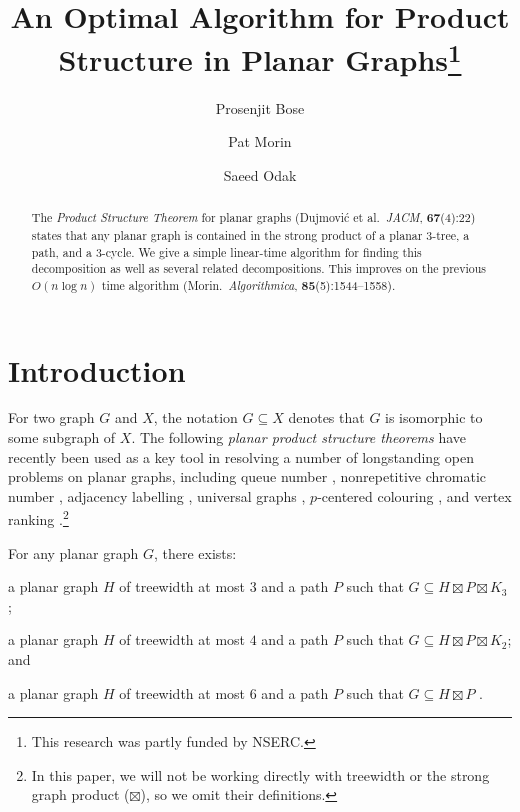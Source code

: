 \documentclass[a4paper,UKenglish,autoref]{lipics-v2021}
\title{An Optimal Algorithm for Product Structure \newline in Planar Graphs\thanks{This research was partly funded by NSERC.}}
\author{Prosenjit Bose}{Carleton University School of Computer Science}{jit@scs.carleton.ca}{https://orcid.org/0000-0002-8906-0573}{}
\author{Pat Morin}{Carleton University School of Computer Science}{morin@scs.carleton.ca}{https://orcid.org/0000-0003-0471-4118}{}
\author{Saeed Odak}{University of Ottawa Department of Computer Science and Electrical Engineering}{saeed.odak@gmail.com}{}{}
\begin{document}
\maketitle

\begin{abstract}
  The \emph{Product Structure Theorem} for planar graphs (Dujmović et al.\ \emph{JACM}, \textbf{67}(4):22) states that any planar graph is contained in the strong product of a planar $3$-tree, a path, and a $3$-cycle.  We give a simple linear-time algorithm for finding this decomposition as well as several related decompositions.  This improves on the previous $O(n\log n)$ time algorithm (Morin.\ \emph{Algorithmica}, \textbf{85}(5):1544--1558).
\end{abstract}

%

\section{Introduction}

For two graph $G$ and $X$, the notation $G\subseteq X$ denotes that $G$ is isomorphic to some subgraph of $X$.
The following \emph{planar product structure theorems} have recently been used as a key tool in resolving a number of longstanding open problems on planar graphs, including queue number \cite{dujmovic.joret.ea:planar}, nonrepetitive chromatic number \cite{dujmovic.esperet.ea:planar}, adjacency labelling \cite{dujmovic.esperet.ea:adjacency}, universal graphs \cite{esperet.joret.ea:sparse}, $p$-centered colouring \cite{debski.felsner.ea:improved}, and vertex ranking \cite{bose.dujmovic.ea:asymptotically}.\footnote{In this paper, we will not be working directly with treewidth or the strong graph product ($\boxtimes$), so we omit their definitions.}

\begin{thm}\label{meta}
  For any planar graph $G$, there exists:
  \begin{compactenum}[(a)]
    \item \label{three_tree} a planar graph $H$ of treewidth at most $3$ and a path $P$ such that $G\subseteq H\boxtimes P\boxtimes K_3$ \cite{dujmovic.joret.ea:planar};
    \item \label{four_tree} a planar graph $H$ of treewidth at most $4$ and a path $P$ such that $G\subseteq H\boxtimes P\boxtimes K_2$; and
    \item \label{six_tree} a planar graph $H$ of treewidth at most $6$ and a path $P$ such that $G\subseteq H\boxtimes P$ \cite{ueckerdt.wood.ea:improved}.
  \end{compactenum}
\end{thm}
\end{document}
